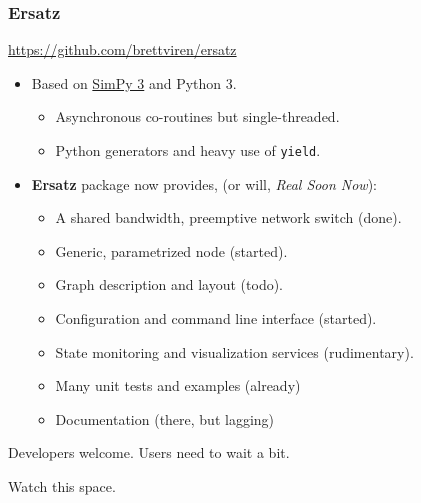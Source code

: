 \documentclass[xcolor=dvipsnames]{beamer}
\begin{document}
\begin{frame}
  \frametitle{Ersatz}

  \begin{center}
    \url{https://github.com/brettviren/ersatz}
  \end{center}

  \begin{itemize}
  \item Based on \href{https://simpy.readthedocs.io/}{SimPy 3} and Python 3.
    \begin{itemize}
    \item Asynchronous co-routines but single-threaded.
    \item Python generators and heavy use of \texttt{yield}.
    \end{itemize}
  \item \textbf{Ersatz} package now provides, (or will, \textit{Real Soon Now}):
    \begin{itemize}
    \item A shared bandwidth, preemptive network switch (done). 
    \item Generic, parametrized node (started).
    \item Graph description and layout (todo).
    \item Configuration and command line interface (started).
    \item State monitoring and visualization services (rudimentary).
    \item Many unit tests and examples (already)
    \item Documentation (there, but lagging)
    \end{itemize}
  \end{itemize}
  Developers welcome.  Users need to wait a bit.

\end{frame}

\begin{frame}
  \begin{center}
    Watch this space.
  \end{center}
\end{frame}
\end{document}
